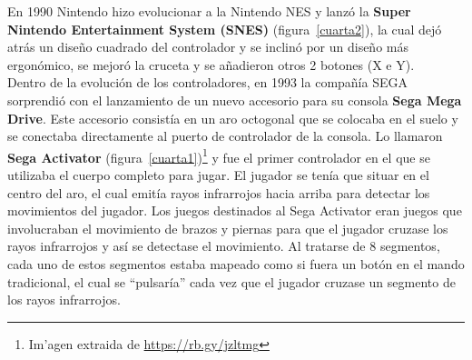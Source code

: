 En 1990 Nintendo hizo evolucionar a la Nintendo NES y lanz\'o la \textbf{Super Nintendo Entertainment System (SNES)} (figura~\ref{cuarta2}), la cual dej\'o atr\'as un dise\~no cuadrado del controlador y se inclin\'o por un dise\~no m\'as ergon\'omico, se mejor\'o la cruceta y se a\~nadieron otros 2 botones (X e Y). \\

Dentro de la evoluci\'on de los controladores, en 1993 la compa\~n\'ia SEGA sorprendi\'o con el lanzamiento de un nuevo accesorio para su consola \textbf{Sega Mega Drive}. Este accesorio consist\'ia en un aro octogonal que se colocaba en el suelo y se conectaba directamente al puerto de controlador de la consola. Lo llamaron \textbf{Sega Activator} (figura~\ref{cuarta1})\footnote{Im'agen extraida de \url{https://rb.gy/jzltmg}} y fue el primer controlador en el que se utilizaba el cuerpo completo para jugar. El jugador se ten\'ia que situar en el centro del aro, el cual emit\'ia rayos infrarrojos hacia arriba para detectar los movimientos del jugador. Los juegos destinados al Sega Activator eran juegos que involucraban el movimiento de brazos y piernas para que el jugador cruzase los rayos infrarrojos y as\'i se detectase el movimiento. Al tratarse de 8 segmentos, cada uno de estos segmentos estaba mapeado como si fuera un bot\'on en el mando tradicional, el cual se ``pulsar\'ia'' cada vez que el jugador cruzase un segmento de los rayos infrarrojos. \\



